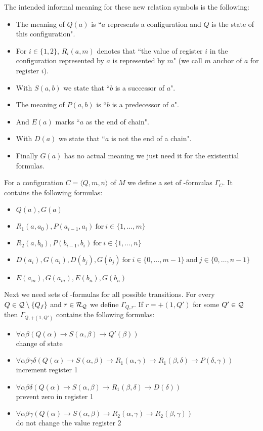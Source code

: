 The intended informal meaning for these new relation symbols is the following:
\begin{itemize}
	\item The meaning of $Q(a)$ is ``$a$ represents a configuration and $Q$ is the state of this configuration".
	\item  For $i\in\{1,2\}$, $R_i(a,m)$ denotes that ``the value of register $i$ in the configuration represented by $a$ is represented by $m$" (we call $m$ anchor of $a$ for register $i$).
	\item With $S(a,b)$ we state that ``$b$ is a successor of $a$".
	\item The meaning of $P(a,b)$ is ``$b$ is a predecessor of $a$".
	\item And $E(a)$ marks ``$a$ as the end of chain".
	\item With $D(a)$ we state that ``$a$ is not the end of a chain".
	\item Finally $G(a)$ has no actual meaning we just need it for the existential formulas. %
\end{itemize}
For a configuration $C=\langle Q,m,n\rangle$ of $M$ we define a set of \SysP-formulas $\Gamma_C$. It contains the following formulas:
\begin{itemize}
	\item $Q(a),G(a)$
	\item $R_1(a,a_0),P(a_{i-1},a_i)~\text{for}~i\in\{1,\dots,m\}$
	\item $R_2(a,b_0),P(b_{i-1},b_i)~\text{for}~i\in\{1,\dots,n\}$
	\item $D(a_i),G(a_i),D(b_j),G(b_j)~\text{for}~i\in\{0,\dots,m-1\}~\text{and}~j\in\{0,\dots,n-1\}$
	\item $E(a_m),G(a_m),E(b_n),G(b_n)$
\end{itemize}
Next we need sets of \SysP-formulas for all possible transitions.
For every $Q\in\mathcal{Q}\setminus\{Q_f\}$ and $r\in\mathcal{R}_{\mathcal{Q}}$ we define $\Gamma_{Q,r}$.
If $r=+(1,Q')$ for some $Q'\in\mathcal{Q}$ then $\Gamma_{Q,+(1,Q')}$ contains the following formulas:
\begin{itemize}
	\item $\forall\alpha\beta(Q(\alpha)\to S(\alpha,\beta)\to Q'(\beta))$ \\change of state
	\item $\forall\alpha\beta\gamma\delta(Q(\alpha)\to S(\alpha,\beta)\to R_1(\alpha,\gamma)\to R_1(\beta,\delta)\to P(\delta,\gamma))$\\increment register 1
	\item $\forall\alpha\beta\delta(Q(\alpha)\to S(\alpha,\beta)\to R_1(\beta,\delta)\to D(\delta))$ \\prevent zero in register 1
	\item $\forall\alpha\beta\gamma(Q(\alpha)\to S(\alpha,\beta)\to R_2(\alpha,\gamma)\to R_2(\beta,\gamma))$ \\do not change the value register 2
\end{itemize}

